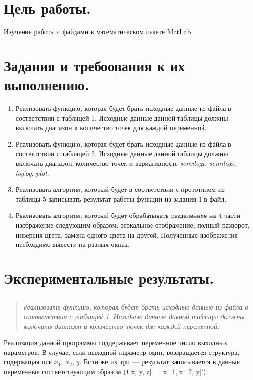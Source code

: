 \section*{Цель работы.}
Изучение работы с файдами в математическом пакете MatLab.

\newcommand{\exOne}{Реализовать функцию, которая будет брать исходные данные из файла в соответствии с таблицей 1. Исходные данные данной таблицы должны включать диапазон и количество точек для каждой переменной.}
\newcommand{\exTwo}{Реализовать функцию, которая будет брать исходные данные из файла в соответствии с таблицей 2. Исходные данные данной таблицы должны включать диапазон, количество точек и вариативность \textit{semilogx}, \textit{semilogx}, \textit{loglog}, \textit{plot}.}
\newcommand{\exThree}{Реализовать алгоритм, который будет в соответствии с прототипом из таблицы 5 записывать результат работы функции из задания 1 в файл.}
\newcommand{\exFour}{Реализовать алгоритм, который будет обрабатывать разделенное на 4 части изображение следующим образом: зеркальное отображение, полный разворот, инверсия цвета, замена одного цвета на другой. Полученные изображения необходимо вывести на разных окнах.}

\section*{Задания и требоования к их выполнению.}
\begin{enumerate}
    \item \exOne
    \item \exTwo
    \item \exThree
    \item \exFour
\end{enumerate}

\section*{Экспериментальные результаты.}
\subsection*{  }

\begin{quote}
    \textit{\exOne}
\end{quote}

Реализация данной программы поддерживает переменное число выходных параметров.
В случае, если выходной параметр один, возвращается структура, содержащая оси $x_1$, $x_2$, $y$.
Если же их три --- результат записывается в данные переменные соответствующим образом (\texttt![x, y, z] = [x_1, x_2, y]!).

